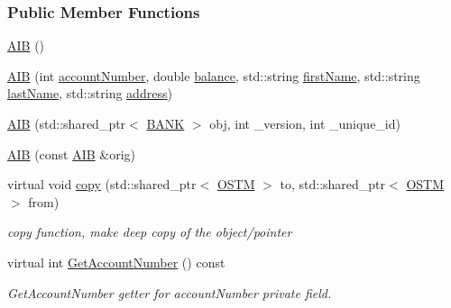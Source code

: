 \subsubsection*{Public Member Functions}
\begin{DoxyCompactItemize}
\item 
\hyperlink{class_a_i_b_a4783110463bf12f937a85b62455faf38_a4783110463bf12f937a85b62455faf38}{A\+IB} ()
\item 
\hyperlink{class_a_i_b_a5fe3963becf294f6b1ce1a747f9122a0_a5fe3963becf294f6b1ce1a747f9122a0}{A\+IB} (int \hyperlink{class_a_i_b_aafc08efeec5b8c800c32ee32f20603a7_aafc08efeec5b8c800c32ee32f20603a7}{account\+Number}, double \hyperlink{class_a_i_b_a3c8d637bd997c1f062d844a88e2559ba_a3c8d637bd997c1f062d844a88e2559ba}{balance}, std\+::string \hyperlink{class_a_i_b_a869f72057cb63ebf0cfd257069e15c7c_a869f72057cb63ebf0cfd257069e15c7c}{first\+Name}, std\+::string \hyperlink{class_a_i_b_ace7b8b648d1b44b7ee2f4be002952b7a_ace7b8b648d1b44b7ee2f4be002952b7a}{last\+Name}, std\+::string \hyperlink{class_a_i_b_ae6a67cc33d1e5fa83a52a238e45ca3dc_ae6a67cc33d1e5fa83a52a238e45ca3dc}{address})
\item 
\hyperlink{class_a_i_b_aa0faccb7aadf423d12bddb2469ff5053_aa0faccb7aadf423d12bddb2469ff5053}{A\+IB} (std\+::shared\+\_\+ptr$<$ \hyperlink{class_b_a_n_k}{B\+A\+NK} $>$ obj, int \+\_\+version, int \+\_\+unique\+\_\+id)
\item 
\hyperlink{class_a_i_b_ab13d0db3498d59dbe6a946c469587c55_ab13d0db3498d59dbe6a946c469587c55}{A\+IB} (const \hyperlink{class_a_i_b}{A\+IB} \&orig)
\item 
virtual void \hyperlink{class_a_i_b_ad76f25ce86cb42028440f41c371903e0_ad76f25ce86cb42028440f41c371903e0}{copy} (std\+::shared\+\_\+ptr$<$ \hyperlink{class_o_s_t_m}{O\+S\+TM} $>$ to, std\+::shared\+\_\+ptr$<$ \hyperlink{class_o_s_t_m}{O\+S\+TM} $>$ from)
\begin{DoxyCompactList}\small\item\em copy function, make deep copy of the object/pointer \end{DoxyCompactList}\item 
virtual int \hyperlink{class_a_i_b_aef34bfbf20d767114e05b8b532cab777_aef34bfbf20d767114e05b8b532cab777}{Get\+Account\+Number} () const 
\begin{DoxyCompactList}\small\item\em Get\+Account\+Number getter for account\+Number private field. \end{DoxyCompactList}\item 

\end{DoxyCompactItemize}
